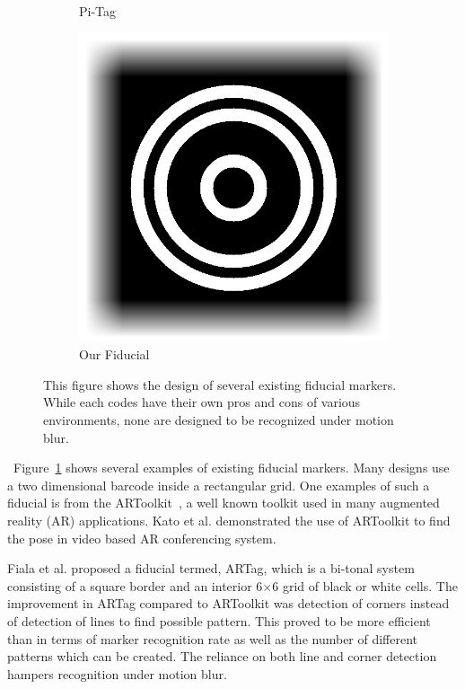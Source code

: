 \documentclass[runningheads]{llncs}
\begin{document}
\begin{figure}
\begin{subfigure}[b]{0.14\textwidth}
  Pi-Tag\cite{Pitag13}
 \end{subfigure}
 \begin{subfigure}[b]{0.14\textwidth}
  \centering
  \includegraphics[width=\linewidth]{our_fiducial}
  Our Fiducial
 \end{subfigure}
 \caption{This figure shows the design of several existing fiducial markers.  While
 each codes have their own pros and cons of various environments, none are designed to be recognized under motion blur.}
 \label{fig:previous_work}
\end{figure}

~Figure~\ref{fig:previous_work} shows several
examples of existing fiducial markers.  Many designs use a two dimensional
barcode inside a rectangular grid. One examples of such a fiducial is from the 
ARToolkit~\cite{ARToolkit02}, a well known toolkit used in many augmented reality (AR) applications. Kato et al.\cite{kato-artoolkit} demonstrated the use of ARToolkit
to find the pose in video based AR conferencing system. 

Fiala et al. \cite{Fiala05} proposed a fiducial termed, ARTag, which is a
bi-tonal system consisting of a square border and an interior 6$\times$6 grid of black or white cells. The improvement in ARTag compared to
ARToolkit was detection of corners instead of detection of lines to find
possible pattern. This proved to be more efficient than \cite{ARToolkit02} in
terms of marker recognition rate as well as the number of different patterns
which can be created.   The reliance on both line and corner detection hampers recognition under motion blur.
\end{document}
